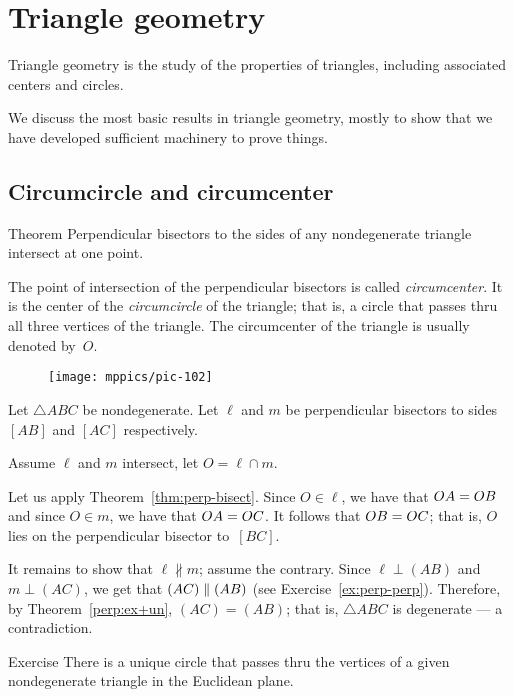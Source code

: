 \chapter{Triangle geometry}\label{chap:triangle}

Triangle geometry is the study of the properties of triangles, including associated centers and circles.

We discuss the most basic results in triangle geometry, 
mostly to show that we have developed sufficient machinery to prove things.

\section{Circumcircle and circumcenter}

\begin{thm}{Theorem}\label{thm:circumcenter}
Perpendicular bisectors to the sides of any nondegenerate triangle intersect at one point.
\end{thm}

The point of intersection of the perpendicular bisectors is called \emph{circumcenter}.
It is the center of the \emph{circumcircle} of the triangle;
that is, a circle that passes thru all three vertices of the triangle.
The circumcenter of the triangle is usually denoted by~$O$.

\begin{wrapfigure}{o}{29mm}
\centering
\texttt{[image: mppics/pic-102]}
\end{wrapfigure}


Let $\triangle ABC$ be nondegenerate.
Let $\ell$ and $m$ be perpendicular bisectors to sides $[AB]$ and $[AC]$ respectively.

Assume $\ell$ and $m$ intersect,
let $O=\ell\cap m$.

Let us apply Theorem~\ref{thm:perp-bisect}.
Since $O\in\ell$, we have that $OA\z=OB$ and since $O\in m$, we have that $OA\z=OC$.
It follows that $OB\z=OC$;
that is, $O$ lies on the perpendicular bisector to~$[B C]$.

It remains to show that $\ell\nparallel m$;
assume the contrary.
Since
$\ell\perp(AB)$ and $m\perp (AC)$, we get that $(AC)\z\parallel (AB)$ 
(see Exercise~\ref{ex:perp-perp}).
Therefore, by Theorem~\ref{perp:ex+un}, $(AC)=(AB)$;
that is, $\triangle ABC$ is degenerate --- a contradiction.
\qeds

\begin{thm}{Exercise}\label{ex:unique-cline}
There is a unique circle that passes thru the vertices of a given nondegenerate triangle in the Euclidean plane. 
\end{thm}

